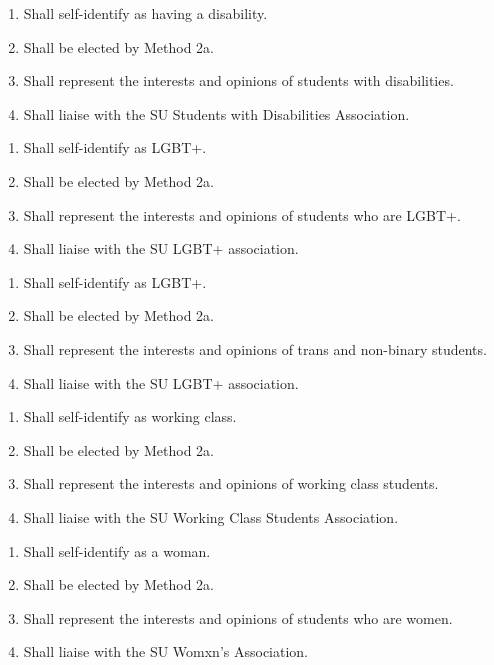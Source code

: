 \begin{enumerate}
    \item Shall self-identify as having a disability. 
    \item Shall be elected by Method 2a.
    \item Shall represent the interests and opinions of students with disabilities.
    \item Shall liaise with the SU Students with Disabilities Association.
\end{enumerate}

\begin{enumerate}
    \item Shall self-identify as LGBT+. 
    \item Shall be elected by Method 2a. 
    \item Shall represent the interests and opinions of students who are LGBT+.  
    \item Shall liaise with the SU LGBT+ association.  
\end{enumerate}

\begin{enumerate}
    \item Shall self-identify as LGBT+. 
    \item Shall be elected by Method 2a. 
    \item Shall represent the interests and opinions of trans and non-binary students. 
    \item Shall liaise with the SU LGBT+ association.  
\end{enumerate}

\begin{enumerate}
    \item Shall self-identify as working class. 
    \item Shall be elected by Method 2a. 
    \item Shall represent the interests and opinions of working class students. 
    \item Shall liaise with the SU Working Class Students Association. 
\end{enumerate}

\begin{enumerate}
    \item Shall self-identify as a woman. \item Shall be elected by Method 2a. 
    \item Shall represent the interests and opinions of students who are women. 
    \item Shall liaise with the SU Womxn’s Association. 
\end{enumerate}

